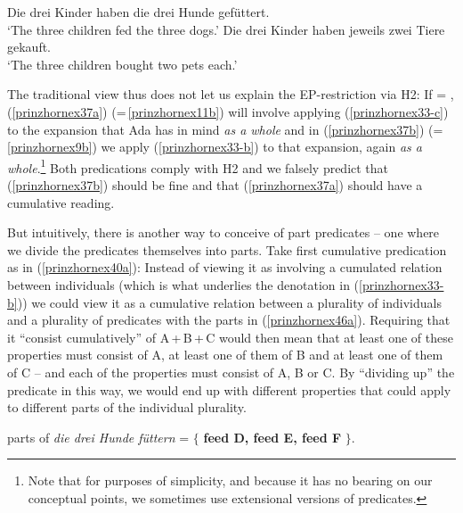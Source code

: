 \documentclass[output=paper]{langscibook}
\begin{document}
\ea \label{prinzhornex40}
\ea Die drei Kinder haben die drei Hunde gefüttert.\\
`The three children fed the three dogs.' \label{prinzhornex40a}
\ex Die drei Kinder haben jeweils zwei Tiere gekauft.\\
`The three children bought two pets each.' \label{prinzhornex40b}
\z\z

The traditional view thus does not let us explain the EP-restriction via H2: If  = ,  (\ref{prinzhornex37a})  (=\,\ref{prinzhornex11b}) will involve applying (\ref{prinzhornex33-c}) to the expansion that Ada has in mind \textit{as a whole} and in (\ref{prinzhornex37b}) (=\,\ref{prinzhornex9b}) we apply (\ref{prinzhornex33-b}) to that expansion, again \textit{as a whole}.\footnote{Note that for purposes of simplicity, and because it has no bearing on our conceptual points, we sometimes use extensional versions of predicates.} Both  predications comply with H2 and we falsely predict that (\ref{prinzhornex37b}) should be fine and that (\ref{prinzhornex37a}) should have a cumulative reading.




\ea  \label{prinzhornpc}
	\z\z

But intuitively, there is another way  to conceive of part predicates -- one where we divide the predicates themselves into parts. Take first cumulative predication as in (\ref{prinzhornex40a}): Instead of viewing it as involving a cumulated relation between individuals (which is what underlies the denotation in (\ref{prinzhornex33-b})) we could view it as a cumulative relation between a plurality of individuals and a plurality of predicates with the parts in  (\ref{prinzhornex46a}). Requiring that it “consist cumulatively” of A\,+\,B\,+\,C would then mean that at least one of these properties must consist of {A}, at least one of them  of {B} and at least one of them of {C} -- and each of the properties must consist of {A}, {B} or {C}. By “dividing up” the predicate in this way, we would  end up with different properties that could apply to different parts of the individual plurality.

\ea  parts of \textit{die drei Hunde füttern} = $\{$ \textbf{feed D, feed E, feed F} $\}$.\label{prinzhornex46a}
\z
\end{document}
